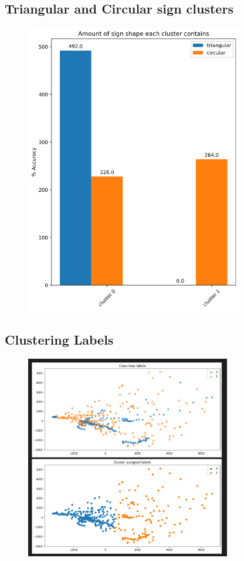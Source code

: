 \documentclass[11pt]{article}
\begin{document}
\begin{appendices}
\subsection{Triangular and Circular sign clusters}\label{TrianCircCluster2} 
\begin{figure}[h!]
  \includegraphics[width=0.85\textwidth]{Images/TriangularCircularClusterBarChart2.png}
\end{figure}

\newpage
\subsection{Clustering Labels}\label{LabelClusters1} 
\begin{figure}[h!]
  \includegraphics[width=0.8\textwidth]{Images/LabelClusters1.png}
\end{figure}


\end{appendices}
\end{document}
